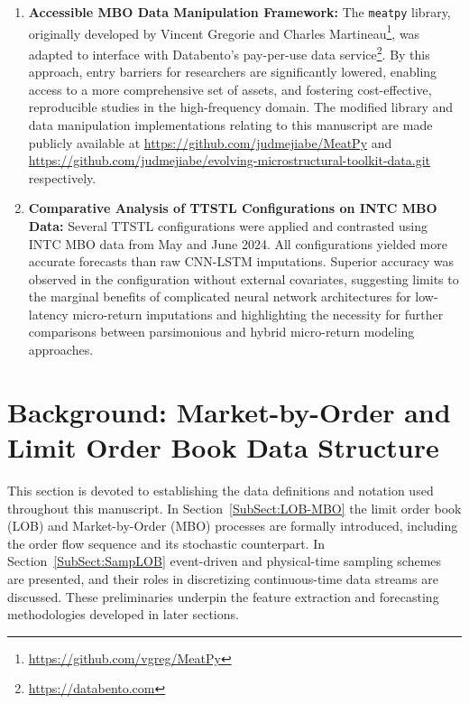 \documentclass{rQUF2e}
\theoremstyle{plain}
\theoremstyle{definition}
\theoremstyle{remark}
\begin{document}
\begin{enumerate}
    \item \textbf{Accessible MBO Data Manipulation Framework:} The \verb|meatpy| library, originally developed by Vincent Gregorie and Charles Martineau\footnote{\url{https://github.com/vgreg/MeatPy}}, was adapted to interface with Databento’s pay-per-use data service\footnote{\url{https://databento.com}}. By this approach, entry barriers for researchers are significantly lowered, enabling access to a more comprehensive set of assets, and fostering cost-effective, reproducible studies in the high-frequency domain. The modified library and data manipulation implementations relating to this manuscript are made publicly available at \url{https://github.com/judmejiabe/MeatPy} and \url{https://github.com/judmejiabe/evolving-microstructural-toolkit-data.git} respectively.

    \item \textbf{Comparative Analysis of TTSTL Configurations on INTC MBO Data:} Several TTSTL configurations were applied and contrasted using INTC MBO data from May and June 2024. All configurations yielded more accurate forecasts than raw CNN-LSTM imputations. Superior accuracy was observed in the configuration without external covariates, suggesting limits to the marginal benefits of complicated neural network architectures for low-latency micro-return imputations and highlighting the necessity for further comparisons between parsimonious and hybrid micro-return modeling approaches.
\end{enumerate}


\section{Background: Market-by-Order and Limit Order Book Data Structure}
\label{Sect:BckGrnd}
This section is devoted to establishing the data definitions and notation used throughout this manuscript.  In Section~\ref{SubSect:LOB-MBO} the limit order book (LOB) and Market-by-Order (MBO) processes are formally introduced, including the order flow sequence and its stochastic counterpart.  In Section~\ref{SubSect:SampLOB} event-driven and physical-time sampling schemes are presented, and their roles in discretizing continuous-time data streams are discussed.  These preliminaries underpin the feature extraction and forecasting methodologies developed in later sections.
\end{document}
